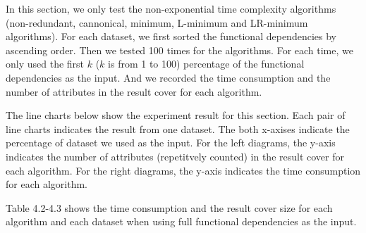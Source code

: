 \documentclass[11pt]{book}
\begin{document}
In this section, we only test the non-exponential time complexity algorithms (non-redundant, cannonical, minimum, L-minimum and LR-minimum algorithms). For each dataset, we first sorted the functional dependencies by ascending order. Then we tested 100 times for the algorithms. For each time, we only used the first $k$ ($k$ is from 1 to 100) percentage of the functional dependencies as the input. And we recorded the time consumption and the number of attributes in the result cover for each algorithm.

The line charts below show the experiment result for this section. Each pair of line charts indicates the result from one dataset. The both x-axises indicate the percentage of dataset we used as the input. For the left diagrams, the y-axis indicates the number of attributes (repetitvely counted) in the result cover for each algorithm. For the right diagrams, the y-axis indicates the time consumption for each algorithm.

Table 4.2-4.3 shows the time consumption and the result cover size for each algorithm and each dataset when using full functional dependencies as the input.
\end{document}
